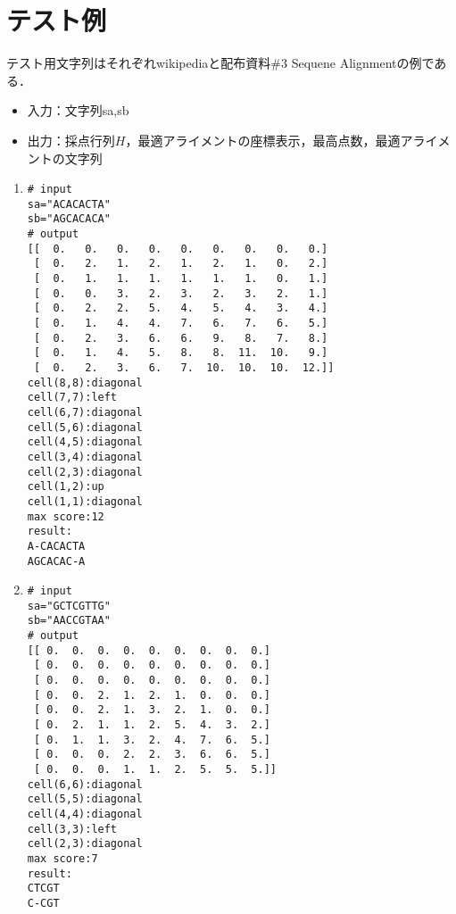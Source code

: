 \documentclass[a4paper,11pt]{jsarticle}
\numberwithin{theorem}{section}  %
\numberwithin{equation}{section} %
\begin{document}
\section{テスト例}
テスト用文字列はそれぞれwikipediaと配布資料\#3 Sequene Alignmentの例である．
\begin{itemize}
\item
入力：文字列sa,sb
\item
出力：採点行列$H$，最適アライメントの座標表示，最高点数，最適アライメントの文字列
\end{itemize}
\newpage
\begin{enumerate}
\item
\begin{verbatim}
# input
sa="ACACACTA"
sb="AGCACACA"
# output
[[  0.   0.   0.   0.   0.   0.   0.   0.   0.]
 [  0.   2.   1.   2.   1.   2.   1.   0.   2.]
 [  0.   1.   1.   1.   1.   1.   1.   0.   1.]
 [  0.   0.   3.   2.   3.   2.   3.   2.   1.]
 [  0.   2.   2.   5.   4.   5.   4.   3.   4.]
 [  0.   1.   4.   4.   7.   6.   7.   6.   5.]
 [  0.   2.   3.   6.   6.   9.   8.   7.   8.]
 [  0.   1.   4.   5.   8.   8.  11.  10.   9.]
 [  0.   2.   3.   6.   7.  10.  10.  10.  12.]]
cell(8,8):diagonal
cell(7,7):left
cell(6,7):diagonal
cell(5,6):diagonal
cell(4,5):diagonal
cell(3,4):diagonal
cell(2,3):diagonal
cell(1,2):up
cell(1,1):diagonal
max score:12
result:
A-CACACTA
AGCACAC-A
\end{verbatim}
\item
\begin{verbatim}
# input
sa="GCTCGTTG"
sb="AACCGTAA"
# output
[[ 0.  0.  0.  0.  0.  0.  0.  0.  0.]
 [ 0.  0.  0.  0.  0.  0.  0.  0.  0.]
 [ 0.  0.  0.  0.  0.  0.  0.  0.  0.]
 [ 0.  0.  2.  1.  2.  1.  0.  0.  0.]
 [ 0.  0.  2.  1.  3.  2.  1.  0.  0.]
 [ 0.  2.  1.  1.  2.  5.  4.  3.  2.]
 [ 0.  1.  1.  3.  2.  4.  7.  6.  5.]
 [ 0.  0.  0.  2.  2.  3.  6.  6.  5.]
 [ 0.  0.  0.  1.  1.  2.  5.  5.  5.]]
cell(6,6):diagonal
cell(5,5):diagonal
cell(4,4):diagonal
cell(3,3):left
cell(2,3):diagonal
max score:7
result:
CTCGT
C-CGT
\end{verbatim}
\end{enumerate}
\end{document}
